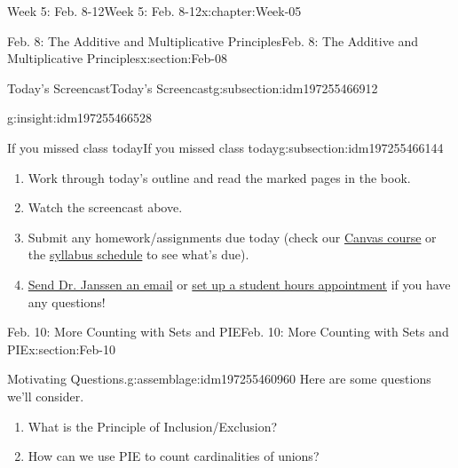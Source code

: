 \documentclass[oneside,10pt,]{book}
\numberwithin{equation}{section}
\begin{document}
\begin{chapterptx}{Week 5: Feb. 8-12}{}{Week 5: Feb. 8-12}{}{}{x:chapter:Week-05}
\begin{sectionptx}{Feb. 8: The Additive and Multiplicative Principles}{}{Feb. 8: The Additive and Multiplicative Principles}{}{}{x:section:Feb-08}
\begin{subsectionptx}{Today's Screencast}{}{Today's Screencast}{}{}{g:subsection:idm197255466912}
\begin{insight}{}{g:insight:idm197255466528}
\begin{tcbraster}[raster columns=2, raster column skip=1pt, raster halign=center, raster force size=false, raster left skip=0pt, raster right skip=0pt]
\begin{tcolorbox}[qrstyle]
[QR LINK]\end{tcolorbox}%
\end{tcbraster}%
\end{insight}
\end{subsectionptx}
%
%
\typeout{************************************************}
\typeout{************************************************}
%
\begin{subsectionptx}{If you missed class today}{}{If you missed class today}{}{}{g:subsection:idm197255466144}
%
\begin{enumerate}
\item{}Work through today's outline and read the marked pages in the book.%
\item{}Watch the screencast above.%
\item{}Submit any homework\slash{}assignments due today (check our \href{https://dordt.instructure.com/courses/3110050}{Canvas course} or the \href{https://prof.mkjanssen.org/ds/index.html\#schedule}{syllabus schedule} to see what's due).%
\item{}\href{mailto:mike.janssen@dordt.edu}{Send Dr. Janssen an email} or \href{https://calendly.com/mkjanssen/student-hours}{set up a student hours appointment} if you have any questions!%
\end{enumerate}
\end{subsectionptx}
\end{sectionptx}
%
%
\typeout{************************************************}
\typeout{************************************************}
%
\begin{sectionptx}{Feb. 10: More Counting with Sets and PIE}{}{Feb. 10: More Counting with Sets and PIE}{}{}{x:section:Feb-10}
\begin{introduction}{}%
\begin{assemblage}{Motivating Questions.}{g:assemblage:idm197255460960}%
Here are some questions we'll consider. %
\begin{enumerate}
\item{}What is the Principle of Inclusion\slash{}Exclusion?%
\item{}How can we use PIE to count cardinalities of unions?%
\end{enumerate}
%
\end{assemblage}
\end{introduction}%
%
%
\typeout{************************************************}

\end{sectionptx}
\end{chapterptx}
\end{document}
